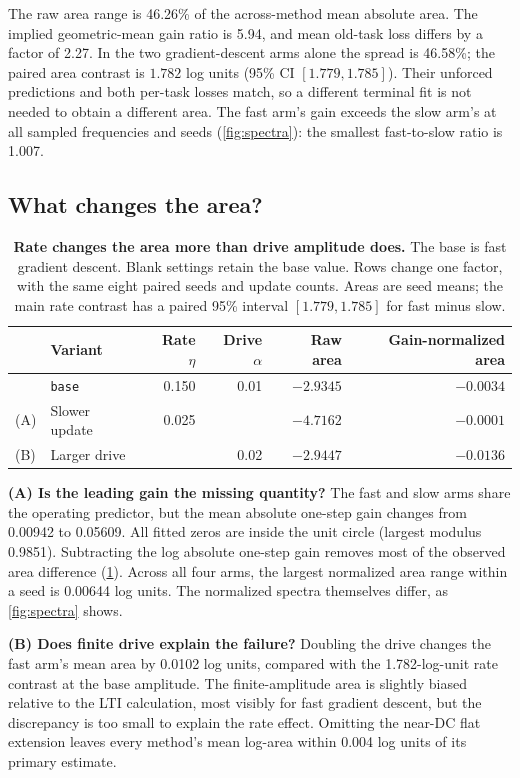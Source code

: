 The raw area range is 46.26\% of the across-method mean absolute area. The implied geometric-mean gain ratio is 5.94, and mean old-task loss differs by a factor of 2.27. In the two gradient-descent arms alone the spread is 46.58\%; the paired area contrast is \(1.782\) log units (95\% CI \([1.779,1.785]\)). Their unforced predictions and both per-task losses match, so a different terminal fit is not needed to obtain a different area. The fast arm's gain exceeds the slow arm's at all sampled frequencies and seeds (\cref{fig:spectra}): the smallest fast-to-slow ratio is 1.007.

\subsection{What changes the area?}

\begin{table}[!t]
  \centering
  \small
  \caption{\textbf{Rate changes the area more than drive amplitude does.}
  The base is fast gradient descent. Blank settings retain the base value. Rows change one factor, with the same eight paired seeds and update counts. Areas are seed means; the main rate contrast has a paired 95\% interval \([1.779,1.785]\) for fast minus slow.}
  \label{tab:ablations}
  \begin{tabular}{llrrrr}
    \toprule
    & Variant & Rate \(\eta\) & Drive \(\alpha\) & Raw area & Gain-normalized area \\
    \midrule
    & \texttt{base} & 0.150 & 0.01 & \(-2.9345\) & \(-0.0034\)\\
    \midrule
    (A) & Slower update & 0.025 & & \(-4.7162\) & \(-0.0001\)\\
    (B) & Larger drive & & 0.02 & \(-2.9447\) & \(-0.0136\)\\
    \bottomrule
  \end{tabular}
\end{table}

\textbf{(A) Is the leading gain the missing quantity?}
The fast and slow arms share the operating predictor, but the mean absolute one-step gain changes from 0.00942 to 0.05609. All fitted zeros are inside the unit circle (largest modulus 0.9851). Subtracting the log absolute one-step gain removes most of the observed area difference (\cref{tab:ablations}). Across all four arms, the largest normalized area range within a seed is 0.00644 log units. The normalized spectra themselves differ, as \cref{fig:spectra} shows.

\textbf{(B) Does finite drive explain the failure?}
Doubling the drive changes the fast arm's mean area by 0.0102 log units, compared with the 1.782-log-unit rate contrast at the base amplitude. The finite-amplitude area is slightly biased relative to the LTI calculation, most visibly for fast gradient descent, but the discrepancy is too small to explain the rate effect. Omitting the near-DC flat extension leaves every method's mean log-area within 0.004 log units of its primary estimate.

